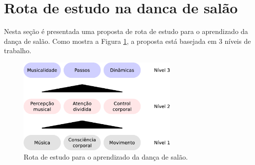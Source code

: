 \section{Rota de estudo na danca de salão}
\label{sec:dance-elements-processo}
Nesta seção é presentada uma proposta de rota de estudo para o aprendizado da
dança de salão. 
Como mostra a Figura \ref{fig:dance-elements-processo},
a proposta está basejada em 3 níveis de trabalho.
\begin{figure}[!h]
\centering
\includegraphics[width=0.7\textwidth]{chapters/cap-dance-elements/Diagrama-danca.eps}
\caption{Rota de estudo para o aprendizado da dança de salão.}
\label{fig:dance-elements-processo}
\end{figure}
